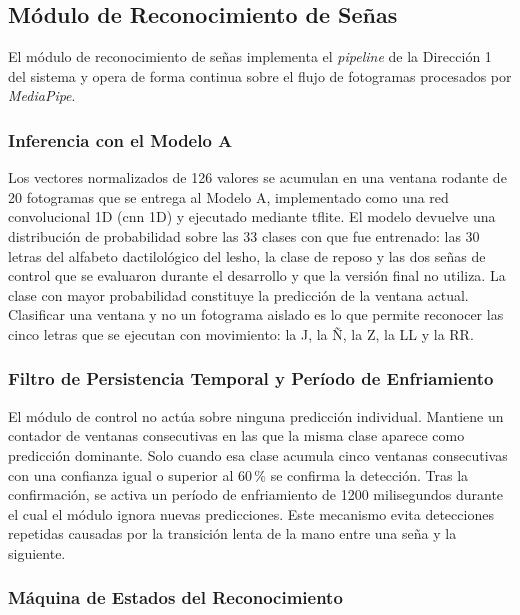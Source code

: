 \subsection{Módulo de Reconocimiento de Señas}
\label{sec:modulo-reconocimiento}

El módulo de reconocimiento de señas implementa el \textit{pipeline} de la
Dirección 1 del sistema y opera de forma continua sobre el flujo de fotogramas
procesados por \textit{MediaPipe}.

\subsubsection{Inferencia con el Modelo A}

Los vectores normalizados de 126 valores se acumulan en una ventana rodante de 20
fotogramas que se entrega al Modelo A, implementado como una red convolucional 1D
(\acrshort{cnn} 1D) y ejecutado mediante \acrshort{tflite}. El modelo devuelve una
distribución de probabilidad sobre las 33 clases con que fue entrenado: las 30 letras del
alfabeto dactilológico del \acrshort{lesho}, la clase de reposo y las dos señas de control
que se evaluaron durante el desarrollo y que la versión final no utiliza. La clase
con mayor probabilidad constituye la predicción de la ventana actual. Clasificar una
ventana y no un fotograma aislado es lo que permite reconocer las cinco letras que se
ejecutan con movimiento: la J, la Ñ, la Z, la LL y la RR.

\subsubsection{Filtro de Persistencia Temporal y Período de Enfriamiento}

El módulo de control no actúa sobre ninguna predicción individual. Mantiene un
contador de ventanas consecutivas en las que la misma clase aparece como predicción
dominante. Solo cuando esa clase acumula cinco ventanas consecutivas con una confianza
igual o superior al 60\,\% se confirma la detección. Tras la confirmación, se activa
un período de enfriamiento de 1200 milisegundos durante el cual el módulo ignora nuevas
predicciones. Este mecanismo evita detecciones repetidas causadas por la transición
lenta de la mano entre una seña y la siguiente.

\subsubsection{Máquina de Estados del Reconocimiento}


